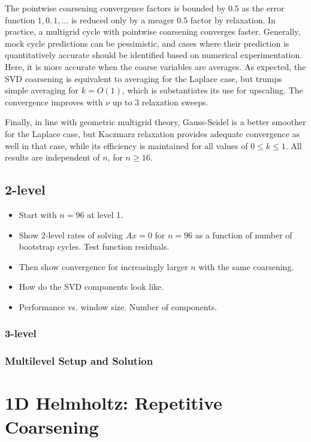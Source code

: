 \documentclass{article}
\begin{document}
The pointwise coarsening convergence factors is bounded by $0.5$ as the error function $1,0,1,\dots$ is reduced only by a meager $0.5$ factor by relaxation. In practice, a multigrid cycle with pointwise coarsening converges faster. Generally, mock cycle predictions can be pessimistic, and cases where their prediction is quantitatively accurate should be identified based on numerical experimentation. Here, it is more accurate when the coarse variables are averages. As expected, the SVD coarsening is equivalent to averaging for the Laplace case, but trumps simple averaging for $k = O(1)$, which is substantiates its use for upscaling. The convergence improves with $\nu$ up to $3$ relaxation sweeps.

Finally, in line with geometric multigrid theory, Gauss-Seidel is a better smoother for the Laplace case, but Kaczmarz relaxation provides adequate convergence as well in that case, while its efficiency is maintained for all values of $0 \leq k \leq 1$. All results are independent of $n$, for $n \geq 16$.

\subsection{2-level}
{\bf 
\begin{itemize}
\item Start with $n=96$ at level 1. 
\item Show 2-level rates of solving $A x = 0$ for $n=96$ as a function of number of bootstrap cycles. Test function residuals.
\item  Then show convergence for increasingly larger $n$ with the same coarsening.
\item How do the SVD components look like.
\item Performance vs. window size. Number of components.
\end{itemize}
}

\subsubsection{3-level}

\subsubsection{Multilevel Setup and Solution}

\section{1D Helmholtz: Repetitive Coarsening}
\label{helm_repetitive}
\end{document}
